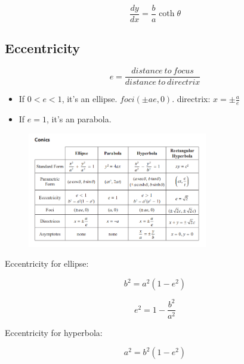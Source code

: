 \documentclass[a4paper,9pt]{scrartcl}
\begin{document}
    \begin{displaymath}
        \frac{dy}{dx} = \frac{b}{a}\coth\theta
    \end{displaymath}

    \subsection{Eccentricity}

    \begin{displaymath}
        e = \frac{distance\ to\ focus}{distance\ to\ directrix}
    \end{displaymath}

    \begin{itemize}
        \item If $0 < e < 1$, it's an ellipse.
        $foci({\pm}ae, 0)$.
        directrix: $x = \pm\frac{a}{e}$
        \item If $e = 1$, it's an parabola.
    \end{itemize}

    \begin{figure}[!htb]
        \centering
        \includegraphics[width=0.7\textwidth]{Conics.png}
    \end{figure}

    Eccentricity for ellipse:

    \begin{displaymath}
        b^2 = a^2(1-e^2)
    \end{displaymath}

    \begin{displaymath}
        e^2 = 1 - \frac{b^2}{a^2}
    \end{displaymath}

    Eccentricity for hyperbola:

    \begin{displaymath}
        a^2 = b^2(1-e^2)
    \end{displaymath}
\end{document}
